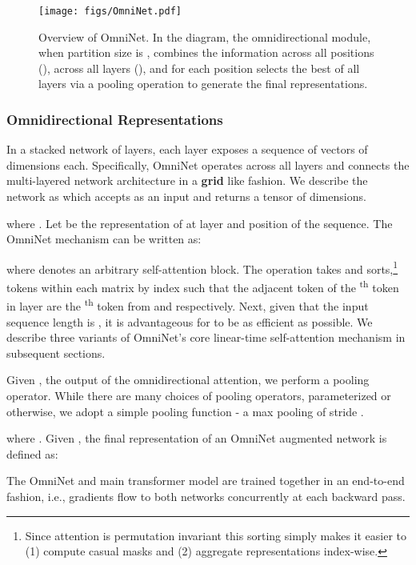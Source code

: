 \documentclass{article}
\begin{document}
\begin{figure}
    \centering
    \texttt{[image: figs/OmniNet.pdf]}
    \vspace{-10pt}
    \caption{Overview of OmniNet. In the diagram, the omnidirectional module, when partition size is , combines the information across all positions (), across all layers (), and for each position selects the best of all layers via a pooling operation to generate the final representations.}
    \label{fig:omninet_diagram}
    \vspace{-10pt}
\end{figure}

\subsubsection{Omnidirectional Representations}
\label{sec:omni_rep}
In a stacked network of  layers, each layer exposes a sequence of  vectors of  dimensions each. Specifically, OmniNet operates across all layers and connects the multi-layered network architecture in a \textbf{grid} like fashion. We describe the network as  which accepts  as an input and returns a tensor of  dimensions.

where . Let  be the representation of  at layer  and position  of the sequence. The OmniNet mechanism can be written as:

where  denotes an arbitrary self-attention block. The  operation takes  and sorts,\footnote{Since attention is permutation invariant this sorting simply makes it easier to (1) compute casual masks and (2) aggregate representations index-wise.} tokens within each matrix by index such that the adjacent token of the \textsuperscript{th} token in layer  are the \textsuperscript{th} token from  and  respectively. 
Next, given that the input sequence length is , it is advantageous for  to be as efficient as possible. We describe three variants of OmniNet's core linear-time self-attention mechanism in subsequent sections. 

Given , the output of the omnidirectional attention, we perform  a pooling operator. While there are many choices of pooling operators, parameterized or otherwise, we adopt a simple pooling function - a max pooling of stride .

where . Given , the final representation of an OmniNet augmented network is defined as:

The OmniNet and main transformer model are trained together in an end-to-end fashion, i.e., gradients flow to both networks concurrently at each backward pass. 
\end{document}
